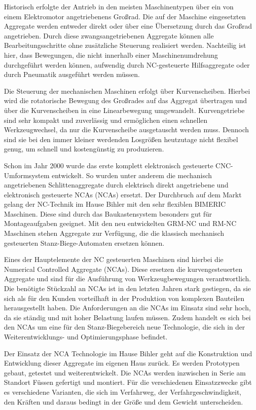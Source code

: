 Historisch erfolgte der Antrieb in den meisten Maschinentypen über ein von einem Elektromotor angetriebenens Großrad. Die auf der Maschine eingesetzten Aggregate werden entweder direkt oder über eine Übersetzung durch das Großrad angetrieben. Durch diese zwangsangetriebenen Aggregate können alle Bearbeitungsschritte ohne zusätzliche Steuerung realisiert werden. Nachteilig ist hier, dass Bewegungen, die nicht innerhalb einer Maschinenumdrehung durchgeführt werden können, aufwendig durch \gls{NC}-gesteuerte Hilfsaggregate oder durch Pneumatik ausgeführt werden müssen.

Die Steuerung der mechanischen Maschinen erfolgt über Kurvenscheiben. Hierbei wird die rotatorische Bewegung des Großrades auf das Aggregat übertragen und über die Kurvenscheiben in eine Linearbewegung umgewandelt. Kurvengetriebe sind sehr kompakt und zuverlässig und ermöglichen einen schnellen Werkzeugwechsel, da nur die Kurvenscheibe ausgetauscht werden muss. Dennoch sind sie bei den immer kleiner werdenden Losgrößen heutzutage nicht flexibel genug, um schnell und kostengünstig zu produzieren.

Schon im Jahr 2000 wurde das erste komplett elektronisch gesteuerte \gls{CNC}-Umformsystem entwickelt. So wurden unter anderem die mechanisch angetriebenen Schlittenaggregate durch elektrisch direkt angetriebene und elektronisch gesteuerte \glspl{NCA} (NCAs) ersetzt. Der Durchbruch auf dem Markt gelang der NC-Technik im Hause Bihler mit den sehr flexiblen BIMERIC Maschinen. Diese sind durch das Baukastensystem besonders gut für Montageaufgaben geeignet. Mit den neu entwickelten GRM-NC und RM-NC Maschinen stehen Aggregate zur Verfügung, die die klassisch mechanisch gesteuerten Stanz-Biege-Automaten ersetzen können. 


Eines der Hauptelemente der NC gesteuerten Maschinen sind hierbei die Numerical Controlled Aggregate (NCAs). Diese ersetzen die kurvengesteuerten Aggregate und sind für die Ausführung von Werkzeugbewegungen verantwortlich. Die benötigte Stückzahl an NCAs ist in den letzten Jahren stark gestiegen, da sie sich als für den Kunden vorteilhaft in der Produktion von komplexen Bauteilen herausgestellt haben. Die Anforderungen an die NCAs im Einsatz sind sehr hoch, da sie ständig und mit hoher Belastung laufen müssen. Zudem handelt es sich bei den NCAs um eine für den Stanz-Biegebereich neue Technologie, die sich in der Weiterentwicklungs- und Optimierungsphase befindet.




Der Einsatz der NCA Technologie im Hause Bihler geht auf die Konstruktion und Entwicklung dieser Aggregate im eigenen Haus zurück. Es werden Prototypen gebaut, getestet und weiterentwickelt. Die NCAs werden inzwischen in Serie am Standort Füssen gefertigt und montiert. Für die verschiedenen Einsatzzwecke gibt es verschiedene Varianten, die sich im Verfahrweg, der Verfahrgeschwindigkeit, den Kräften und daraus bedingt in der Größe und dem Gewicht unterscheiden.

